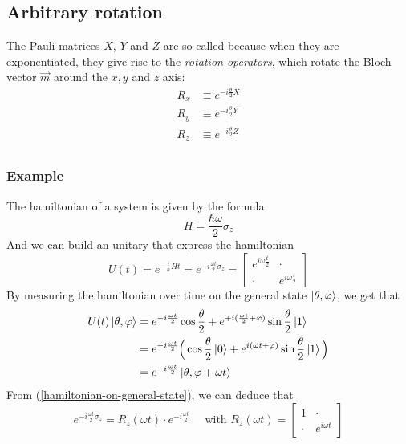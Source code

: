 \documentclass{article}
\begin{document}
\subsection{Arbitrary rotation}
The Pauli matrices $X$, $Y$ and $Z$ are so-called because when they are
exponentiated, they give rise to the \textit{rotation operators}, which rotate
the Bloch vector $\vec{m}$ around the $x, y$ and $z$ axis:
\begin{equation}
    \begin{aligned}
        R_x & \equiv e^{-i\frac{\theta}{2}X} \\
        R_y & \equiv e^{-i\frac{\theta}{2}Y} \\
        R_z & \equiv e^{-i\frac{\theta}{2}Z} \\
    \end{aligned}
\end{equation}


\subsubsection*{Example}
The hamiltonian of a system is given by the formula
\begin{equation}
        H=\frac{\hbar\omega}{2}\sigma_z
\end{equation}
And we can build an unitary that express the hamiltonian
\begin{equation}
    U(t) = e^{-\frac{i}{\hbar}Ht}=e^{-i\frac{\omega t}{2}\sigma_z}
    = \begin{bmatrix}
        e^{i\omega\frac{t}{2}} & \cdot \\ \cdot & e^{i\omega\frac{t}{2}}
    \end{bmatrix}
\end{equation}
By measuring the hamiltonian over time on the general state $\ket{\theta,
\varphi}$, we get that
\begin{equation}
    \label{hamiltonian-on-general-state}
    \begin{aligned}
        U(t)\ket{\theta, \varphi}
            & = e^{-i\frac{\omega t}{2}}\cos\frac{\theta}{2} +
                e^{+i(\frac{\omega t}{2}+\varphi)}\sin\frac{\theta}{2}\ket{1} \\
            & = e^{-i\frac{\omega t}{2}}\Big(\cos\frac{\theta}{2}\ket{0} +
                e^{i(\omega t + \varphi)}\sin\frac{\theta}{2}\ket{1}\Big) \\
            & = e^{-i\frac{\omega t}{2}}\ket{\theta, \varphi + \omega t}    \end{aligned}
\end{equation}
From (\ref{hamiltonian-on-general-state}), we can deduce that
\begin{equation}
    e^{-i\frac{\omega t}{2}\sigma_z}=R_z(\omega t)\cdot e^{-i\frac{\omega t}{2}}
    \quad \text{ with } R_z(\omega t) = \begin{bmatrix}
        1 & \cdot \\ \cdot & e^{i\omega t}
    \end{bmatrix}
\end{equation}
\end{document}
